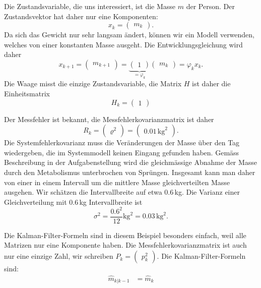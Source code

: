 \begin{loesung}
\begin{teilaufgaben}
\item
Die Zustandsvariable, die uns interessiert, ist die Masse $m$ der Person.
Der Zustandsvektor hat daher nur eine Komponenten:
\[
x_k = \begin{pmatrix}m_k\end{pmatrix}.
\]
Da sich das Gewicht nur sehr langsam ändert, können wir ein Modell verwenden,
welches von einer konstanten Masse ausgeht.
Die Entwicklungsgleichung wird daher
\[
x_{k+1}
=
\begin{pmatrix}m_{k+1}\end{pmatrix}
=
\underbrace{\begin{pmatrix}1\end{pmatrix}}_{\displaystyle=\varphi_k}
\begin{pmatrix}m_k\end{pmatrix}
=
\varphi_kx_k.
\]
Die Waage misst die einzige Zustandsvariable, die Matrix $H$ ist
daher die Einheitsmatrix 
\[
H_k = \begin{pmatrix}1\end{pmatrix}
\]
\item
Der Messfehler ist bekannt, die Messfehlerkovarianzmatrix ist daher
\[
R_k
=
\begin{pmatrix} \varrho^2\end{pmatrix}
=
\begin{pmatrix} 0.01\,\text{kg}^2\end{pmatrix}.
\]
Die Systemfehlerkovarianz muss die Veränderungen der Masse über den Tag
wiedergeben, die im Systemmodell keinen Eingang gefunden haben.
Gemäss Beschreibung in der Aufgabenstellung wird die gleichmässige
Abnahme der Masse durch den Metabolismus unterbrochen von Sprüngen.
Insgesamt kann man daher von einer in einem Intervall um die mittlere
Masse gleichverteilten Masse ausgehen.
Wir schätzen die Intervallbreite auf etwa 0.6\,kg.
Die Varianz einer Gleichverteilung mit 0.6\,kg Intervallbreite ist
\[
\sigma^2 = \frac{0.6^2}{12}\text{kg}^2 = 0.03\,\text{kg}^2.
\]
\item
Die Kalman-Filter-Formeln sind in diesem Beispiel besonders einfach,
weil alle Matrizen nur eine Komponente haben.
Die Messfehlerkovarianzmatrix ist auch nur eine einzige Zahl, wir
schreiben $P_k=\begin{pmatrix}p_k^2\end{pmatrix}$.
Die Kalman-Filter-Formeln sind:
\begin{align*}
\hat m_{k|k-1}&=\hat m_k

\end{align*}
\end{teilaufgaben}
\end{loesung}

